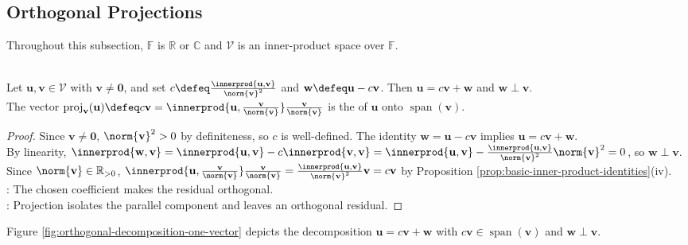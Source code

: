 \subsection{Orthogonal Projections}

Throughout this subsection, $\mathbb{F}$ is $\mathbb{R}$ or $\mathbb{C}$ and $\mathcal{V}$ is an inner-product space over $\mathbb{F}$.

\begin{proposition} \label{prop:orthogonal-projection-onto-line} \\
Let $\mathbf{u},\mathbf{v}\in\mathcal{V}$ with $\mathbf{v}\neq\mathbf{0}$, and set $c\defeq\frac{\innerprod{\mathbf{u},\mathbf{v}}}{\norm{\mathbf{v}}^2}$ and $\mathbf{w}\defeq\mathbf{u}-c\mathbf{v}$. Then $\mathbf{u}=c\mathbf{v}+\mathbf{w}$ and $\mathbf{w}\perp\mathbf{v}$.\\
The vector $\operatorname{proj}_{\mathbf{v}}(\mathbf{u})\defeq c\mathbf{v}=\innerprod{\mathbf{u},\frac{\mathbf{v}}{\norm{\mathbf{v}}}}\frac{\mathbf{v}}{\norm{\mathbf{v}}}$ is the  of $\mathbf{u}$ onto $\operatorname{span}(\mathbf{v})$.
\begin{proof}
Since $\mathbf{v}\neq\mathbf{0}$, $\norm{\mathbf{v}}^2>0$ by definiteness, so $c$ is well-defined. The identity $\mathbf{w}=\mathbf{u}-c\mathbf{v}$ implies $\mathbf{u}=c\mathbf{v}+\mathbf{w}$.\\
By linearity, $\innerprod{\mathbf{w},\mathbf{v}}=\innerprod{\mathbf{u},\mathbf{v}}-c\innerprod{\mathbf{v},\mathbf{v}}=\innerprod{\mathbf{u},\mathbf{v}}-\frac{\innerprod{\mathbf{u},\mathbf{v}}}{\norm{\mathbf{v}}^2}\norm{\mathbf{v}}^2=0$, so $\mathbf{w}\perp\mathbf{v}$.\\
Since $\norm{\mathbf{v}}\in\mathbb{R}_{>0}$, $\innerprod{\mathbf{u},\frac{\mathbf{v}}{\norm{\mathbf{v}}}}\frac{\mathbf{v}}{\norm{\mathbf{v}}}=\frac{\innerprod{\mathbf{u},\mathbf{v}}}{\norm{\mathbf{v}}^2}\mathbf{v}=c\mathbf{v}$ by Proposition \ref{prop:basic-inner-product-identities}(iv).\\
: The chosen coefficient makes the residual orthogonal.\\
: Projection isolates the parallel component and leaves an orthogonal residual.
\end{proof}
\end{proposition}

Figure \ref{fig:orthogonal-decomposition-one-vector} depicts the decomposition $\mathbf{u}=c\mathbf{v}+\mathbf{w}$ with $c\mathbf{v}\in\operatorname{span}(\mathbf{v})$ and $\mathbf{w}\perp\mathbf{v}$.

